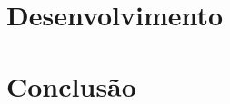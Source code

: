 \documentclass[
	12pt,				%
	oneside,
	a4paper,			%
	english,			%
	french,				%
	spanish,			%
	brazil				%
	]{abntex2}
\begin{document}

\part{Desenvolvimento}



\part{Conclusão}



\postextual

%
\end{document}
